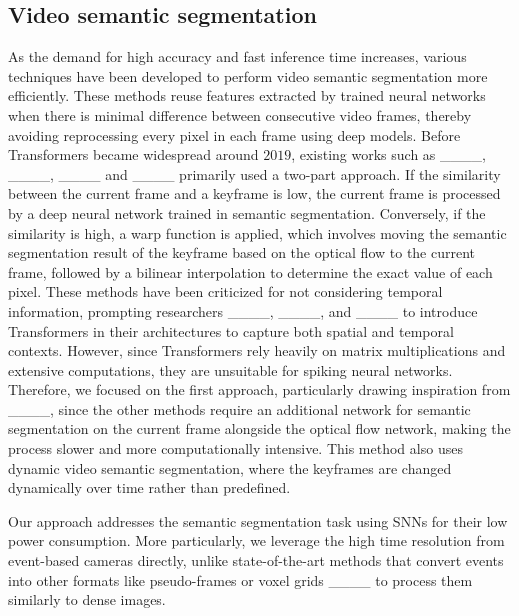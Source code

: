 \subsection{Video semantic segmentation} %
As the demand for high accuracy and fast inference time increases, various techniques have been developed to perform video semantic segmentation more efficiently. These methods reuse features extracted by trained neural networks when there is minimal difference between consecutive video frames, thereby avoiding reprocessing every pixel in each frame using deep models. Before Transformers became widespread around $2019$, existing works such as ____, ____, ____ and ____ primarily used a two-part approach. If the similarity between the current frame and a keyframe is low, the current frame is processed by a deep neural network trained in semantic segmentation.
Conversely, if the similarity is high, a warp function is applied, which involves moving the semantic segmentation result of the keyframe based on the optical flow to the current frame, followed by a bilinear interpolation to determine the exact value of each pixel. These methods have been criticized for not considering temporal information, prompting researchers ____, ____, and ____ to introduce Transformers in their architectures to capture both spatial and temporal contexts. However, since Transformers rely heavily on matrix multiplications and extensive computations, they are unsuitable for spiking neural networks. Therefore, we focused on the first approach, particularly drawing inspiration from ____, since the other methods require an additional network for semantic segmentation on the current frame alongside the optical flow network, making the process slower and more computationally intensive. This method also uses dynamic video semantic segmentation, where the keyframes are changed dynamically over time rather than predefined.

\noindent Our approach addresses the semantic segmentation task using SNNs for their low power consumption. More particularly, we leverage the high time resolution from event-based cameras directly, unlike state-of-the-art methods that convert events into other formats like pseudo-frames or voxel grids ____ to process them similarly to dense images.